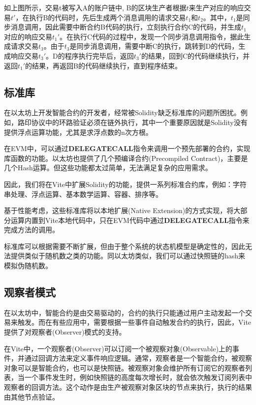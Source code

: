 \documentclass[UTF8,nofonts]{ctexart}
\begin{document}
\begin{multicols}{2}
如上图所示，交易t被写入A的账户链中, B的区块生产者根据$t$来生产对应的响应交易${t}'$，在执行B的代码时，先后生成两个消息调用的请求交易$t_{1}$和$t_{2}$。其中，$t_{1}$是同步消息调用，因此需要中断合约B代码的执行，立刻执行合约C的代码，并生成$t_{1}$对应的响应交易${t_{1}}'$。在执行C代码的过程中，发现一个同步消息调用指令，据此生成请求交易$t_{3}$。由于$t_{3}$是同步消息调用，需要中断C的执行，跳转到D的代码，生成响应交易${t_{3}}'$。D的程序执行完毕后，返回${t_{3}}'$的结果，回到C的代码继续执行，并返回${t_{1}}'$的结果，再返回B的代码继续执行，直到程序结束。

\subsection{标准库}
在以太坊上开发智能合约的开发者，经常被Solidity缺乏标准库的问题所困扰。例如，路印协议中的环路验证必须在链外执行，其中一个重要原因就是Solidity没有提供浮点运算功能，尤其是求浮点数的n次方根\cite{loopring}。

在EVM中，可以通过\textbf{DELEGATECALL}指令来调用一个预先部署的合约，实现库函数的功能。以太坊也提供了几个预编译合约(Precompiled Contract)，主要是几个Hash运算。但这些功能都太过简单，无法满足复杂的应用需求。

因此，我们将在Vite中扩展Solidity的功能，提供一系列标准合约库，例如：字符串处理、浮点运算、基本数学运算、容器、排序等。

基于性能考虑，这些标准库将以本地扩展(Native Extension)的方式实现，将大部分运算内置到Vite本地代码中，只在EVM代码中通过\textbf{DELEGATECALL}指令来完成方法的调用。

标准库可以根据需要不断扩展，但由于整个系统的状态机模型是确定性的，因此无法提供类似于随机数之类的功能。同以太坊类似，我们可以通过快照链的hash来模拟伪随机数。

\subsection{观察者模式}
在以太坊中，智能合约是由交易驱动的，合约的执行只能通过用户主动发起一个交易来触发。而在有些应用中，需要根据一些事件自动触发合约的执行，因此，Vite提供了对观察者(Observer)模式的支持。

在Vite中，一个观察者(Observer)可以订阅一个被观察对象(Observable)上的事件，并通过回调方法来定义事件响应逻辑。通常，观察者是一个智能合约，被观察对象可以是智能合约，也可以是快照链。被观察对象会维护所有订阅它的观察者列表，当一个事件发生时，例如快照链的高度每次增长时，就会依次触发订阅列表中观察者的回调方法。这个动作是由生产被观察对象区块的节点来执行，执行的结果由其他节点验证。


\end{multicols}
\end{document}
